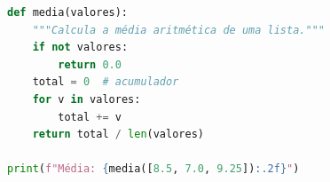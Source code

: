 \begin{codigo}[htbp]
\begin{ilustracao}[\linewidth]{\caption{Função em Python, com numeração de linhas e sintaxe colorida}\label{cod:guia-python}}{\elaboracaopropria{}}
  \begin{lstlisting}[language=Python]
def media(valores):
    """Calcula a média aritmética de uma lista."""
    if not valores:
        return 0.0
    total = 0  # acumulador
    for v in valores:
        total += v
    return total / len(valores)

print(f"Média: {media([8.5, 7.0, 9.25]):.2f}")
  \end{lstlisting}
\end{ilustracao}
\end{codigo}
